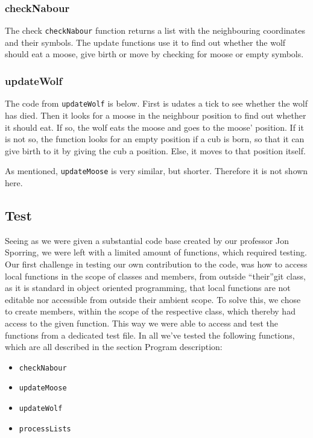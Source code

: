 \documentclass[a4paper]{report}
\begin{document}
\subsubsection*{checkNabour}
The check \texttt{checkNabour} function returns a list with the neighbouring coordinates and their symbols. The update functions use it to find out whether the wolf should eat a moose, give birth or move by checking for moose or empty symbols.




\subsubsection*{updateWolf}


The code from \texttt{updateWolf} is below. First is udates a tick to see whether the wolf has died. Then it looks for a moose in the neighbour position to find out whether it should eat. If so, the wolf eats the moose and goes to the moose' position. If it is not so, the function looks for an empty position if a cub is born, so that it can give birth to it by giving the cub a position. Else, it moves to that position itself. 

As mentioned, \texttt{updateMoose} is very similar, but shorter. Therefore it is not shown here.




\subsection*{Test}

Seeing as we were given a substantial code base created by our professor Jon Sporring, we were left with a limited amount of functions, which required testing.
Our first challenge in testing our own contribution to the code, was how to access local functions in the scope of classes and members, from outside “their”git  class, as it is standard in object oriented programming, that local functions are not editable nor accessible from outside their ambient scope.
To solve this, we chose to create members, within the scope of the respective class, which thereby had access to the given function. This way we were able to access and test the functions from a dedicated test file.
In all we’ve tested the following functions, which are all described in the section Program description:
\begin{itemize}
\item \texttt{checkNabour}
\item \texttt{updateMoose}
\item \texttt{updateWolf}
\item \texttt{processLists}
\end{itemize}
\end{document}
